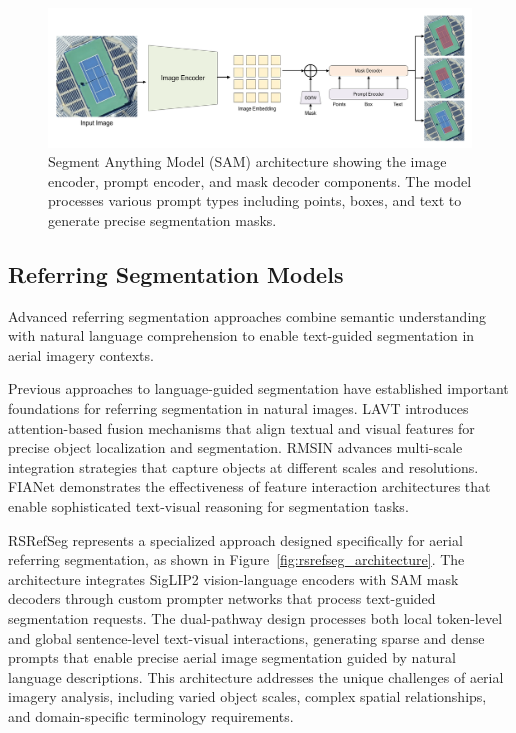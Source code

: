 \begin{figure}[htbp]
\centering
\includegraphics[width=1.0\textwidth]{../Images/sam.png}
\caption{Segment Anything Model (SAM) architecture showing the image encoder, prompt encoder, and mask decoder components. The model processes various prompt types including points, boxes, and text to generate precise segmentation masks.}
\label{fig:sam_architecture}
\end{figure}

\subsection{Referring Segmentation Models}

Advanced referring segmentation approaches combine semantic understanding with natural language comprehension to enable text-guided segmentation in aerial imagery contexts.

Previous approaches to language-guided segmentation have established important foundations for referring segmentation in natural images. LAVT introduces attention-based fusion mechanisms that align textual and visual features for precise object localization and segmentation. RMSIN advances multi-scale integration strategies that capture objects at different scales and resolutions. FIANet demonstrates the effectiveness of feature interaction architectures that enable sophisticated text-visual reasoning for segmentation tasks.

RSRefSeg represents a specialized approach designed specifically for aerial referring segmentation, as shown in Figure~\ref{fig:rsrefseg_architecture}. The architecture integrates SigLIP2 vision-language encoders with SAM mask decoders through custom prompter networks that process text-guided segmentation requests. The dual-pathway design processes both local token-level and global sentence-level text-visual interactions, generating sparse and dense prompts that enable precise aerial image segmentation guided by natural language descriptions. This architecture addresses the unique challenges of aerial imagery analysis, including varied object scales, complex spatial relationships, and domain-specific terminology requirements.

